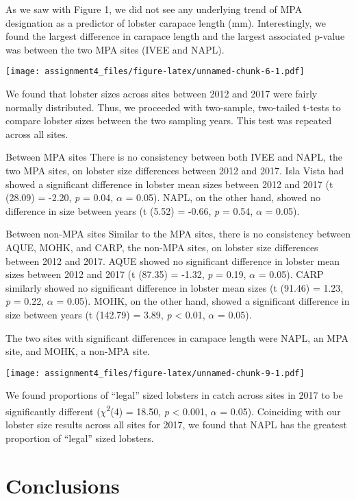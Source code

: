 \documentclass[]{article}
\begin{document}
As we saw with Figure 1, we did not see any underlying trend of MPA
designation as a predictor of lobster carapace length (mm).
Interestingly, we found the largest difference in carapace length and
the largest associated p-value was between the two MPA sites (IVEE and
NAPL).

\texttt{[image: assignment4\_files/figure-latex/unnamed-chunk-6-1.pdf]}

We found that lobster sizes across sites between 2012 and 2017 were
fairly normally distributed. Thus, we proceeded with two-sample,
two-tailed t-tests to compare lobster sizes between the two sampling
years. This test was repeated across all sites.

Between MPA sites There is no consistency between both IVEE and NAPL,
the two MPA sites, on lobster size differences between 2012 and 2017.
Isla Vista had showed a significant difference in lobster mean sizes
between 2012 and 2017 (t (28.09) = -2.20, \emph{p} = 0.04, \(\alpha\) =
0.05). NAPL, on the other hand, showed no difference in size between
years (t (5.52) = -0.66, \emph{p} = 0.54, \(\alpha\) = 0.05).

Between non-MPA sites Similar to the MPA sites, there is no consistency
between AQUE, MOHK, and CARP, the non-MPA sites, on lobster size
differences between 2012 and 2017. AQUE showed no significant difference
in lobster mean sizes between 2012 and 2017 (t (87.35) = -1.32, \emph{p}
= 0.19, \(\alpha\) = 0.05). CARP similarly showed no significant
difference in lobster mean sizes (t (91.46) = 1.23, \emph{p} = 0.22,
\(\alpha\) = 0.05). MOHK, on the other hand, showed a significant
difference in size between years (t (142.79) = 3.89, \emph{p}
\textless{} 0.01, \(\alpha\) = 0.05).

The two sites with significant differences in carapace length were NAPL,
an MPA site, and MOHK, a non-MPA site.

\texttt{[image: assignment4\_files/figure-latex/unnamed-chunk-9-1.pdf]}

We found proportions of ``legal'' sized lobsters in catch across sites
in 2017 to be significantly different (\(\chi\)\textsuperscript{2}(4) =
18.50, \emph{p} \textless{} 0.001, \(\alpha\) = 0.05). Coinciding with
our lobster size results across all sites for 2017, we found that NAPL
has the greatest proportion of ``legal'' sized lobsters.

\section{Conclusions}\label{conclusions}
\end{document}
